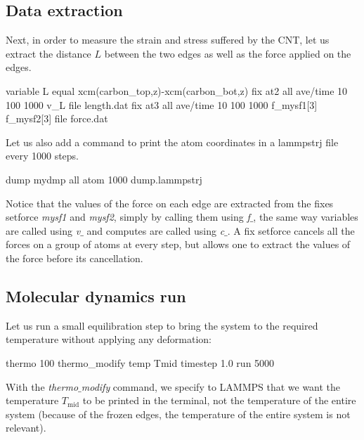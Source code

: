 \noindent \subsection{Data extraction}

Next, in order to measure the strain and stress suffered by the
CNT, let us extract the distance $L$ between
the two edges as well as the force applied on the edges.

\begin{lcverbatim}
variable L equal xcm(carbon_top,z)-xcm(carbon_bot,z)
fix at2 all ave/time 10 100 1000 v_L file length.dat
fix at3 all ave/time 10 100 1000 f_mysf1[3] f_mysf2[3] file force.dat
\end{lcverbatim}

\noindent Let us also add a command to print the atom coordinates in a
lammpstrj file every 1000 steps.

\begin{lcverbatim}
dump mydmp all atom 1000 dump.lammpstrj
\end{lcverbatim}

\noindent \begin{tcolorbox}[colback=mylightblue!5!white,colframe=mylightblue!75!black,title=About extracting quantity from variable compute or fix]
Notice that the values of the force on each edge are
extracted from the fixes setforce \textit{mysf1} and \textit{mysf2}, simply by
calling them using \textit{f$\_$}, the same way variables are called
using \textit{v$\_$} and computes are called using \textit{c$\_$}. A fix
setforce cancels all the forces on a group of atoms at every
step, but allows one to extract the values of the force
before its cancellation.
\end{tcolorbox}

\noindent \subsection{Molecular dynamics run}

Let us run a small equilibration step to bring the system 
to the required temperature without applying any deformation:

\begin{lcverbatim}
thermo 100
thermo_modify temp Tmid
timestep 1.0
run 5000
\end{lcverbatim}

\noindent With the \textit{thermo$\_$modify} command, we specify to LAMMPS that we
want the temperature $T_\mathrm{mid}$ to be printed in
the terminal, not the temperature of the entire system
(because of the frozen edges, the temperature of the entire
system is not relevant). 

